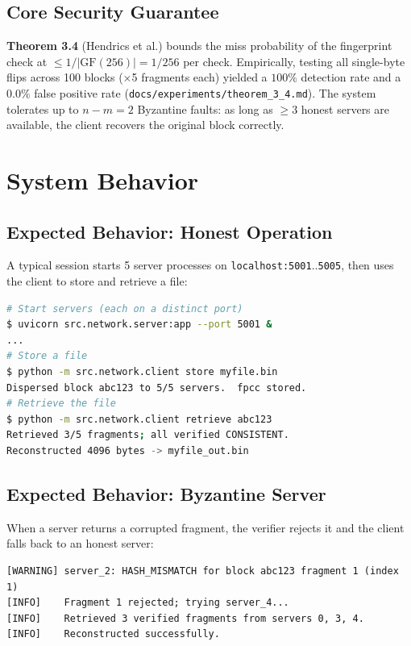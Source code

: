 \documentclass[10pt]{article}
\begin{document}
\subsection{Core Security Guarantee}

\textbf{Theorem 3.4} (Hendrics et al.) bounds the miss probability of the fingerprint check at $\leq 1/|\mathrm{GF}(256)| = 1/256$ per check.  Empirically, testing all single-byte flips across 100 blocks ($\times$5 fragments each) yielded a $100\%$ detection rate and a $0.0\%$ false positive rate (\texttt{docs/experiments/theorem\_3\_4.md}).  The system tolerates up to $n - m = 2$ Byzantine faults: as long as $\geq 3$ honest servers are available, the client recovers the original block correctly.

\section{System Behavior}

\subsection{Expected Behavior: Honest Operation}

A typical session starts 5 server processes on \texttt{localhost:5001}..\texttt{5005},
then uses the client to store and retrieve a file:

\begin{lstlisting}[language=bash]
# Start servers (each on a distinct port)
$ uvicorn src.network.server:app --port 5001 &
...
# Store a file
$ python -m src.network.client store myfile.bin
Dispersed block abc123 to 5/5 servers.  fpcc stored.
# Retrieve the file
$ python -m src.network.client retrieve abc123
Retrieved 3/5 fragments; all verified CONSISTENT.
Reconstructed 4096 bytes -> myfile_out.bin
\end{lstlisting}

\subsection{Expected Behavior: Byzantine Server}

When a server returns a corrupted fragment, the verifier rejects it and the client falls
back to an honest server:

\begin{lstlisting}
[WARNING] server_2: HASH_MISMATCH for block abc123 fragment 1 (index 1)
[INFO]    Fragment 1 rejected; trying server_4...
[INFO]    Retrieved 3 verified fragments from servers 0, 3, 4.
[INFO]    Reconstructed successfully.
\end{lstlisting}
\end{document}
